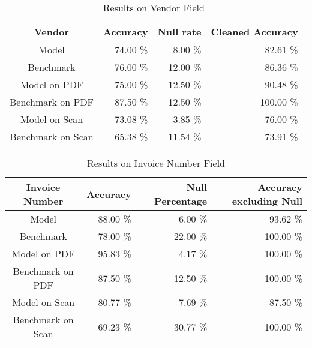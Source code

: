 \begin{table}[ht]   %
    \centering
    \footnotesize
    \begin{tabular}{c|rrr} %
        \toprule    %
        Vendor  & Accuracy  & Null rate & Cleaned Accuracy \\
        \midrule    %
        Model               & 74.00 \%   & 8.00 \%   & 82.61 \% \\
        Benchmark           & 76.00 \%   & 12.00 \%  & 86.36 \%\\
        \midrule    %
        Model on PDF        & 75.00 \%   & 12.50 \%  & 90.48 \% \\
        Benchmark on PDF    & 87.50 \%   & 12.50 \%  & 100.00 \% \\
        \midrule    %
        Model on Scan       & 73.08 \%  & 3.85 \%   & 76.00 \% \\
        Benchmark on Scan   & 65.38 \%  & 11.54 \%  & 73.91 \% \\

        \bottomrule %
    \end{tabular}
    \caption{Results on Vendor Field}
    \label{table:Model_Bench_Vendor}
\end{table}
\begin{table}[ht]   %
    \centering
    \footnotesize
    \begin{tabular}{c|rrr} %
        \toprule    %
        Invoice Number  & Accuracy  & Null Percentage & Accuracy excluding Null \\
        \midrule    %
        Model               & 88.00 \%   & 6.00 \%   & 93.62 \% \\
        Benchmark           & 78.00 \%   & 22.00 \%  & 100.00 \%\\
        \midrule    %
        Model on PDF        & 95.83 \%   & 4.17 \%  & 100.00 \% \\
        Benchmark on PDF    & 87.50 \%   & 12.50 \%  & 100.00 \% \\
        \midrule    %
        Model on Scan       & 80.77 \%  & 7.69 \%   & 87.50 \% \\
        Benchmark on Scan   & 69.23 \%  & 30.77 \%  & 100.00 \% \\

        \bottomrule %
    \end{tabular}
    \caption{Results on Invoice Number Field}
    \label{table:Model_Bench_Number}
\end{table}
